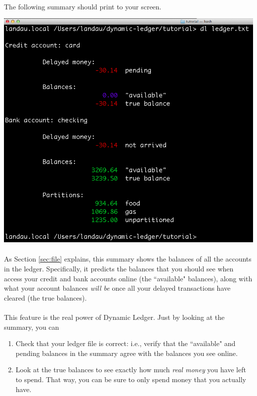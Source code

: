 \documentclass{article}
\begin{document}
\begin{flushleft}
\paragraph{} The following summary should print to your screen.

\begin{center}
\includegraphics[scale=.45]{fig/usage0.png}
\end{center} 

\paragraph{} As Section \ref{sec:file} explains, this summary shows the balances of all the accounts in the ledger. Specifically, it predicts the balances that you should see when access your credit and bank accounts online (the ``available" balances), along with what your account balances \emph{will be} once all your delayed transactions have cleared (the true balances). 

\paragraph{} This feature is the real power of Dynamic Ledger. Just by looking at the summary, you can

\begin{enumerate}
\item Check that your ledger file is correct: i.e., verify that the ``available" and pending balances in the summary agree with the balances you see online.
\item Look at the true balances to see exactly how much \emph{real money} you have left to spend. That way, you can be sure to only spend money that you actually have.
\end{enumerate}


\end{flushleft}
\end{document}
